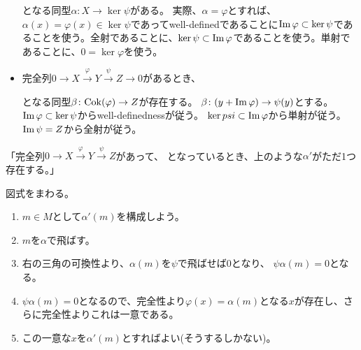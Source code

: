 \documentclass[9pt]{ltjsarticle}
\def\MARU#1{\textcircled{\scriptsize #1}}
\begin{document}
\begin{itemize}
   \begin{center}
   \end{center}
   となる同型$\alpha\colon X \to \ker \psi$がある。
   実際、$\alpha = \varphi$とすれば、$\alpha(x) = \varphi(x) \in \ker \psi$であってwell-definedであることに$\mathop\mathrm{Im} \varphi \subset \ker \psi$であることを使う。全射であることに、$\ker \psi \subset \mathop\mathrm{Im} \varphi$であることを使う。単射であることに、$0= \ker \varphi$を使う。
   \item 完全列$0 \to X \xrightarrow{\varphi} Y \xrightarrow{\psi} Z \to 0$があるとき、
   \begin{center}
   \end{center}
   となる同型$\beta\colon \mathrm{Cok}(\varphi) \to Z$が存在する。
   $\beta\colon (y + \mathop\mathrm{Im} \varphi) \to \psi(y)$とする。
   $\mathop\mathrm{Im} \varphi \subset \ker \psi$からwell-definednessが従う。
   $\ker psi \subset \mathop\mathrm{Im} \varphi$から単射が従う。
   $\mathop\mathrm{Im} \psi = Z$から全射が従う。
\end{itemize}


「完全列$0 \to X \xrightarrow{\varphi} Y \xrightarrow{\psi} Z$があって、
となっているとき、上のような$\alpha'$がただ1つ存在する。」
\begin{myproof}
  図式をまわる。
  \begin{enumerate}[label=\MARU{\arabic*}]
    \item $m\in M$として$\alpha'(m)$を構成しよう。
    \item $m$を$\alpha$で飛ばす。
    \item 右の三角の可換性より、$\alpha(m)$を$\psi$で飛ばせば0となり、
    $\psi\alpha(m) = 0$となる。
    \item $\psi\alpha(m)=0$となるので、完全性より$\varphi(x)=\alpha(m)$となる$x$が存在し、さらに完全性よりこれは一意である。
    \item この一意な$x$を$\alpha'(m)$とすればよい(そうするしかない)。
  \end{enumerate}
\end{myproof}
\end{document}
